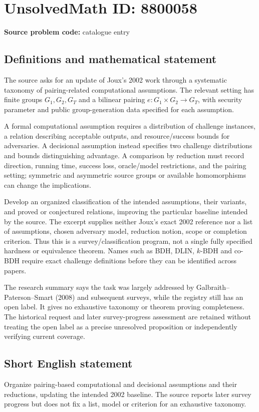 \documentclass[11pt]{article}
\begin{document}
\section*{UnsolvedMath ID: 8800058}
\textbf{Source problem code:} catalogue entry
\subsection{Definitions and mathematical statement}
The source asks for an update of Joux's 2002 work through a systematic taxonomy of pairing-related computational assumptions. The relevant setting has finite groups \(G_1,G_2,G_T\) and a bilinear pairing \(e:G_1\times G_2\to G_T\), with security parameter and public group-generation data specified for each assumption.

A formal computational assumption requires a distribution of challenge instances, a relation describing acceptable outputs, and resource/success bounds for adversaries. A decisional assumption instead specifies two challenge distributions and bounds distinguishing advantage. A comparison by reduction must record direction, running time, success loss, oracle/model restrictions, and the pairing setting; symmetric and asymmetric source groups or available homomorphisms can change the implications.

Develop an organized classification of the intended assumptions, their variants, and proved or conjectured relations, improving the particular baseline intended by the source. The excerpt supplies neither Joux's exact 2002 reference nor a list of assumptions, chosen adversary model, reduction notion, scope or completion criterion. Thus this is a survey/classification program, not a single fully specified hardness or equivalence theorem. Names such as BDH, DLIN, \(k\)-BDH and co-BDH require exact challenge definitions before they can be identified across papers.

The research summary says the task was largely addressed by Galbraith--Paterson--Smart (2008) and subsequent surveys, while the registry still has an open label. It gives no exhaustive taxonomy or theorem proving completeness. The historical request and later survey-progress assessment are retained without treating the open label as a precise unresolved proposition or independently verifying current coverage.
\subsection{Short English statement}
Organize pairing-based computational and decisional assumptions and their reductions, updating the intended 2002 baseline. The source reports later survey progress but does not fix a list, model or criterion for an exhaustive taxonomy.
\end{document}

